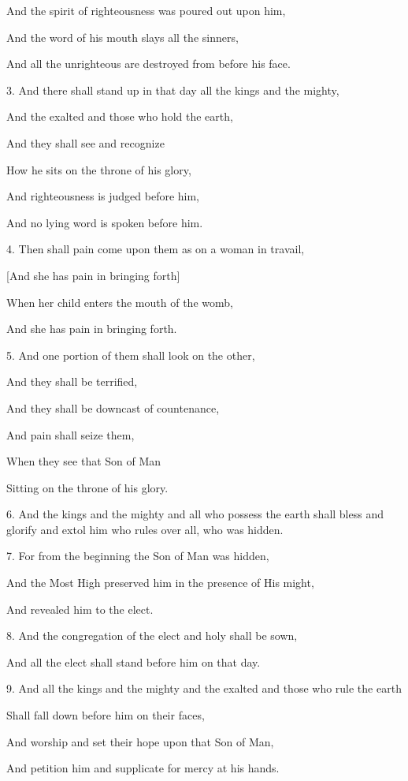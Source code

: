 And the spirit of righteousness was poured out upon him,

And the word of his mouth slays all the sinners,

And all the unrighteous are destroyed from before his face.

3. And there shall stand up in that day all the kings and the mighty,

And the exalted and those who hold the earth,

And they shall see and recognize

How he sits on the throne of his glory,

And righteousness is judged before him,

And no lying word is spoken before him.

4. Then shall pain come upon them as on a woman in travail,

[And she has pain in bringing forth]

When her child enters the mouth of the womb,

And she has pain in bringing forth.

5. And one portion of them shall look on the other,

And they shall be terrified,

And they shall be downcast of countenance,

And pain shall seize them,

When they see that Son of Man

Sitting on the throne of his glory.

6. And the kings and the mighty and all who possess
the earth shall bless and glorify and extol him who
rules over all, who was hidden.

7. For from the beginning the Son of Man was hidden,

And the Most High preserved him in the presence of His might,

And revealed him to the elect.

8. And the congregation of the elect and holy shall be sown,

And all the elect shall stand before him on that day.

9. And all the kings and the mighty and the exalted and those who rule the earth

Shall fall down before him on their faces,

And worship and set their hope upon that Son of Man,

And petition him and supplicate for mercy at his hands.

